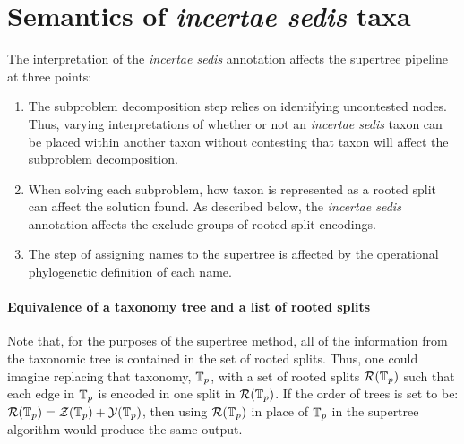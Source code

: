 \documentclass[english]{article}
\begin{document}
\section{\label{sec:Semantics-of-incertae}Semantics of \emph{incertae
sedis} taxa}


The interpretation of the \emph{incertae sedis} annotation affects the supertree
    pipeline at three points:
\begin{enumerate}
    \item The subproblem decomposition step relies on identifying uncontested nodes.
    Thus, varying interpretations of whether or not an \emph{incertae sedis}
    taxon can be placed within another taxon without contesting that taxon
    will affect the subproblem decomposition.
    \item When solving each subproblem, how taxon is represented as a rooted
    split can affect the solution found.
    As described below, the \emph{incertae sedis} annotation affects the 
        exclude groups of rooted split encodings.
    \item The step of assigning names to the supertree is affected by the 
        operational phylogenetic definition of each name.
\end{enumerate}

\paragraph{Equivalence of a taxonomy tree and a list of rooted splits}

Note that, for the purposes of the supertree method, all of the
information from the taxonomic tree is contained in the set of rooted
splits.
Thus, one could imagine replacing that taxonomy,
$\mbox{\ensuremath{\mathbb{T}}}_{p}$, with a set of rooted splits $\mathcal{R}(\mbox{\ensuremath{\mathbb{T}}}_{p})$ 
such that each edge in
$\mbox{\ensuremath{\mathbb{T}}}_{p}$ is encoded in one split in
$\mathcal{R}(\mbox{\ensuremath{\mathbb{T}}}_{p})$.
If the order of trees is set to be:
$\mathcal{R}(\mbox{\ensuremath{\mathbb{T}}}_{p})=\mathcal{Z}(\mbox{\ensuremath{\mathbb{T}}}_{p}) + 
\mathcal{Y}(\mbox{\ensuremath{\mathbb{T}}}_{p})$, then using $\mathcal{R}(\mbox{\ensuremath{\mathbb{T}}}_{p})$ in
place of $\mbox{\ensuremath{\mathbb{T}}}_{p}$ in the supertree algorithm would produce the
same output.
\end{document}
